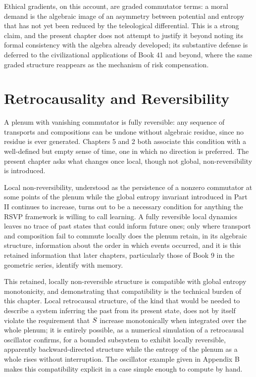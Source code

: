 Ethical gradients, on this account, are graded commutator terms: a moral demand is the algebraic image of an asymmetry between potential and entropy that has not yet been reduced by the teleological differential. This is a strong claim, and the present chapter does not attempt to justify it beyond noting its formal consistency with the algebra already developed; its substantive defense is deferred to the civilizational applications of Book 41 and beyond, where the same graded structure reappears as the mechanism of risk compensation.

\chapter{Retrocausality and Reversibility}

A plenum with vanishing commutator is fully reversible: any sequence of transports and compositions can be undone without algebraic residue, since no residue is ever generated. Chapters 5 and 2 both associate this condition with a well-defined but empty sense of time, one in which no direction is preferred. The present chapter asks what changes once local, though not global, non-reversibility is introduced.

Local non-reversibility, understood as the persistence of a nonzero commutator at some points of the plenum while the global entropy invariant introduced in Part II continues to increase, turns out to be a necessary condition for anything the RSVP framework is willing to call learning. A fully reversible local dynamics leaves no trace of past states that could inform future ones; only where transport and composition fail to commute locally does the plenum retain, in its algebraic structure, information about the order in which events occurred, and it is this retained information that later chapters, particularly those of Book 9 in the geometric series, identify with memory.

This retained, locally non-reversible structure is compatible with global entropy monotonicity, and demonstrating that compatibility is the technical burden of this chapter. Local retrocausal structure, of the kind that would be needed to describe a system inferring the past from its present state, does not by itself violate the requirement that $S$ increase monotonically when integrated over the whole plenum; it is entirely possible, as a numerical simulation of a retrocausal oscillator confirms, for a bounded subsystem to exhibit locally reversible, apparently backward-directed structure while the entropy of the plenum as a whole rises without interruption. The oscillator example given in Appendix B makes this compatibility explicit in a case simple enough to compute by hand.

